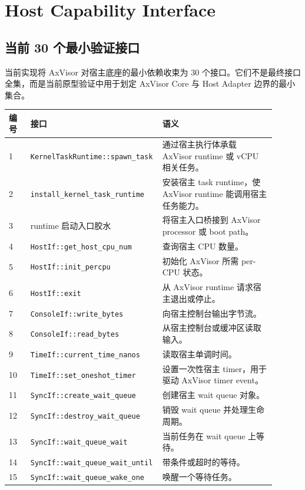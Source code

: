 \documentclass[a4paper,11pt]{article}
\begin{document}
\section{Host Capability Interface}

\subsection{当前 30 个最小验证接口}

当前实现将 AxVisor 对宿主底座的最小依赖收束为 30 个接口。它们不是最终接口全集，而是当前原型验证中用于划定 AxVisor Core 与 Host Adapter 边界的最小集合。

\begin{longtable}{p{0.08\linewidth}p{0.40\linewidth}p{0.42\linewidth}}
\toprule
编号 & 接口 & 语义 \\
\midrule
\endhead
1 & \texttt{KernelTaskRuntime::spawn\_task} & 通过宿主执行体承载 AxVisor runtime 或 vCPU 相关任务。 \\
2 & \texttt{install\_kernel\_task\_runtime} & 安装宿主 task runtime，使 AxVisor runtime 能调用宿主任务能力。 \\
3 & runtime 启动入口胶水 & 将宿主入口桥接到 AxVisor processor 或 boot path。 \\
4 & \texttt{HostIf::get\_host\_cpu\_num} & 查询宿主 CPU 数量。 \\
5 & \texttt{HostIf::init\_percpu} & 初始化 AxVisor 所需 per-CPU 状态。 \\
6 & \texttt{HostIf::exit} & 从 AxVisor runtime 请求宿主退出或停止。 \\
7 & \texttt{ConsoleIf::write\_bytes} & 向宿主控制台输出字节流。 \\
8 & \texttt{ConsoleIf::read\_bytes} & 从宿主控制台或缓冲区读取输入。 \\
9 & \texttt{TimeIf::current\_time\_nanos} & 读取宿主单调时间。 \\
10 & \texttt{TimeIf::set\_oneshot\_timer} & 设置一次性宿主 timer，用于驱动 AxVisor timer event。 \\
11 & \texttt{SyncIf::create\_wait\_queue} & 创建宿主 wait queue 对象。 \\
12 & \texttt{SyncIf::destroy\_wait\_queue} & 销毁 wait queue 并处理生命周期。 \\
13 & \texttt{SyncIf::wait\_queue\_wait} & 当前任务在 wait queue 上等待。 \\
14 & \texttt{SyncIf::wait\_queue\_wait\_until} & 带条件或超时的等待。 \\
15 & \texttt{SyncIf::wait\_queue\_wake\_one} & 唤醒一个等待任务。 \\

\end{longtable}
\end{document}
